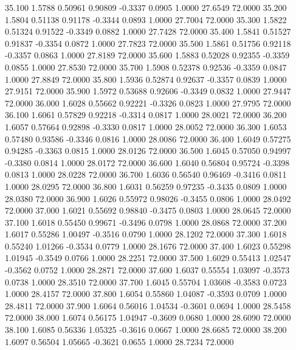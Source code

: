   35.100   1.5788   0.50961   0.90809  -0.3337   0.0905   1.0000  27.6549  72.0000
  35.200   1.5804   0.51138   0.91178  -0.3344   0.0893   1.0000  27.7004  72.0000
  35.300   1.5822   0.51324   0.91522  -0.3349   0.0882   1.0000  27.7428  72.0000
  35.400   1.5841   0.51527   0.91837  -0.3354   0.0872   1.0000  27.7823  72.0000
  35.500   1.5861   0.51756   0.92118  -0.3357   0.0863   1.0000  27.8189  72.0000
  35.600   1.5883   0.52028   0.92355  -0.3359   0.0855   1.0000  27.8530  72.0000
  35.700   1.5908   0.52378   0.92536  -0.3359   0.0847   1.0000  27.8849  72.0000
  35.800   1.5936   0.52874   0.92637  -0.3357   0.0839   1.0000  27.9151  72.0000
  35.900   1.5972   0.53688   0.92606  -0.3349   0.0832   1.0000  27.9447  72.0000
  36.000   1.6028   0.55662   0.92221  -0.3326   0.0823   1.0000  27.9795  72.0000
  36.100   1.6061   0.57829   0.92218  -0.3314   0.0817   1.0000  28.0021  72.0000
  36.200   1.6057   0.57664   0.92898  -0.3330   0.0817   1.0000  28.0052  72.0000
  36.300   1.6053   0.57480   0.93586  -0.3346   0.0816   1.0000  28.0086  72.0000
  36.400   1.6049   0.57275   0.94285  -0.3363   0.0815   1.0000  28.0126  72.0000
  36.500   1.6045   0.57050   0.94997  -0.3380   0.0814   1.0000  28.0172  72.0000
  36.600   1.6040   0.56804   0.95724  -0.3398   0.0813   1.0000  28.0228  72.0000
  36.700   1.6036   0.56540   0.96469  -0.3416   0.0811   1.0000  28.0295  72.0000
  36.800   1.6031   0.56259   0.97235  -0.3435   0.0809   1.0000  28.0380  72.0000
  36.900   1.6026   0.55972   0.98026  -0.3455   0.0806   1.0000  28.0492  72.0000
  37.000   1.6021   0.55692   0.98840  -0.3475   0.0803   1.0000  28.0645  72.0000
  37.100   1.6018   0.55450   0.99671  -0.3496   0.0798   1.0000  28.0868  72.0000
  37.200   1.6017   0.55286   1.00497  -0.3516   0.0790   1.0000  28.1202  72.0000
  37.300   1.6018   0.55240   1.01266  -0.3534   0.0779   1.0000  28.1676  72.0000
  37.400   1.6023   0.55298   1.01945  -0.3549   0.0766   1.0000  28.2251  72.0000
  37.500   1.6029   0.55413   1.02547  -0.3562   0.0752   1.0000  28.2871  72.0000
  37.600   1.6037   0.55554   1.03097  -0.3573   0.0738   1.0000  28.3510  72.0000
  37.700   1.6045   0.55704   1.03608  -0.3583   0.0723   1.0000  28.4157  72.0000
  37.800   1.6054   0.55860   1.04087  -0.3593   0.0709   1.0000  28.4811  72.0000
  37.900   1.6064   0.56016   1.04534  -0.3601   0.0694   1.0000  28.5458  72.0000
  38.000   1.6074   0.56175   1.04947  -0.3609   0.0680   1.0000  28.6090  72.0000
  38.100   1.6085   0.56336   1.05325  -0.3616   0.0667   1.0000  28.6685  72.0000
  38.200   1.6097   0.56504   1.05665  -0.3621   0.0655   1.0000  28.7234  72.0000
